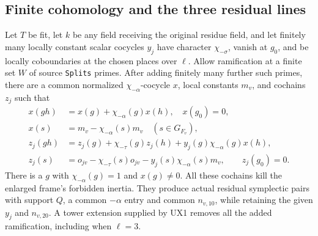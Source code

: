 \subsection{Finite cohomology and the three residual lines}

\begin{proposition}
Let $T$ be fit, let $k$ be any field receiving the original
residue field, and let finitely many locally constant
scalar cocycles $y_j$ have character $\chi_{-\sigma}$,
vanish at $g_0$, and be locally coboundaries at the chosen
places over $\ell$.  Allow ramification at a finite set
$W$ of source \texttt{Splits} primes.  After adding finitely
many further such primes, there are a common normalized
$\chi_{-\alpha}$-cocycle $x$, local constants $m_v$, and
cochains $z_j$ such that
\[
\begin{aligned}
 x(gh)&=x(g)+\chi_{-\alpha}(g)x(h),\quad x(g_0)=0,\\
 x(s)&=m_v-\chi_{-\alpha}(s)m_v\quad(s\in G_{F_v}),\\
 z_j(gh)&=z_j(g)+\chi_{-\tau}(g)z_j(h)
                 +y_j(g)\chi_{-\alpha}(g)x(h),\\
 z_j(s)&=o_{jv}-\chi_{-\tau}(s)o_{jv}
                 -y_j(s)\chi_{-\alpha}(s)m_v,
 \qquad z_j(g_0)=0.
\end{aligned}
 \tag{UX.14}
\]
There is a $g$ with $\chi_{-\alpha}(g)=1$ and $x(g)\ne0$.
All these cochains kill the enlarged frame's forbidden
inertia.  They produce actual residual symplectic pairs
with support $Q$, a common $-\alpha$ entry and common
$n_{v,10}$, while retaining the given $y_j$ and
$n_{v,20}$.  A tower extension supplied by UX1 removes
all the added ramification, including when $\ell=3$.
\end{proposition}

